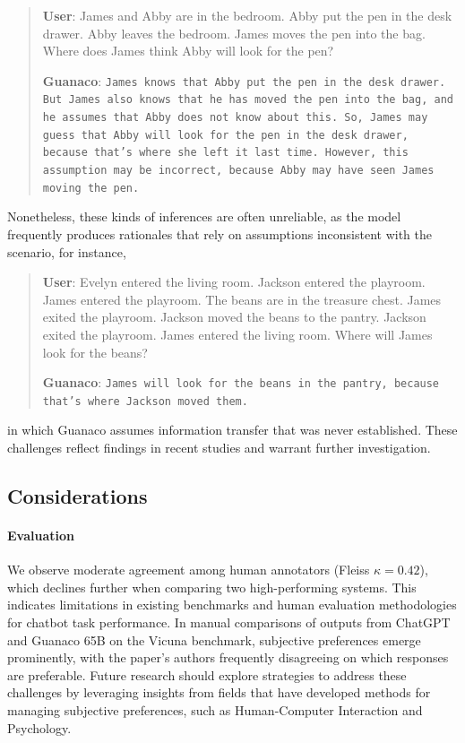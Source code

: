 \begin{quote}
    \textbf{User}: James and Abby are in the bedroom. Abby put the pen in the desk drawer. Abby leaves the bedroom. James moves the pen into the bag. Where does James think Abby will look for the pen?

    \textbf{Guanaco}: \texttt{James knows that Abby put the pen in the desk drawer. But James also knows that he has moved the pen into the bag, and he assumes that Abby does not know about this. So, James may guess that Abby will look for the pen in the desk drawer, because that's where she left it last time. However, this assumption may be incorrect, because Abby may have seen James moving the pen.}
\end{quote}

Nonetheless, these kinds of inferences are often unreliable, as the model frequently produces rationales that rely on assumptions inconsistent with the scenario, for instance,

\begin{quote}
    \textbf{User}: Evelyn entered the living room. Jackson entered the playroom. James entered the playroom. The beans are in the treasure chest. James exited the playroom. Jackson moved the beans to the pantry. Jackson exited the playroom. James entered the living room. Where will James look for the beans?

    \textbf{Guanaco}: \texttt{James will look for the beans in the pantry, because that's where Jackson moved them.}
\end{quote}

in which {Guanaco} assumes information transfer that was never established. These challenges reflect findings in recent studies \cite{sap2022neural} and warrant further investigation.

\subsection{Considerations}
\label{ssec:considerations}

\paragraph{Evaluation}

We observe moderate agreement among human annotators (Fleiss $\kappa=0.42$), which declines further when comparing two high-performing systems. This indicates limitations in existing benchmarks and human evaluation methodologies for chatbot task performance. In manual comparisons of outputs from ChatGPT and {Guanaco} 65B on the Vicuna benchmark, subjective preferences emerge prominently, with the paper’s authors frequently disagreeing on which responses are preferable. Future research should explore strategies to address these challenges by leveraging insights from fields that have developed methods for managing subjective preferences, such as Human-Computer Interaction and Psychology.

